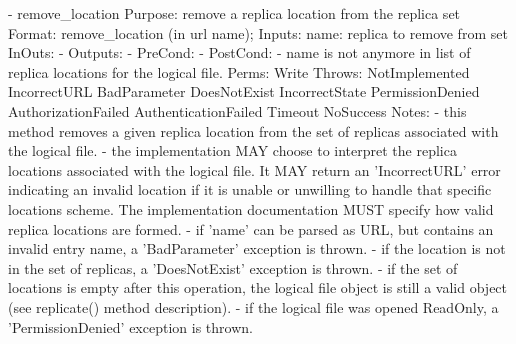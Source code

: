 \begin{myspec}
 
    - remove_location
      Purpose:  remove a replica location from the replica set
      Format:   remove_location  (in  url       name);
      Inputs:   name:             replica to remove from set
      InOuts:   -
      Outputs:  -
      PreCond:  -
      PostCond: - name is not anymore in list of replica 
                  locations for the logical file.
      Perms:    Write
      Throws:   NotImplemented
                IncorrectURL
                BadParameter
                DoesNotExist
                IncorrectState
                PermissionDenied
                AuthorizationFailed
                AuthenticationFailed
                Timeout
                NoSuccess
      Notes:    - this method removes a given replica location 
                  from the set of replicas associated with the 
                  logical file.
                - the implementation MAY choose to interpret the
                  replica locations associated with the logical 
                  file.  It MAY return an 'IncorrectURL' error 
                  indicating an invalid location if it is unable 
                  or unwilling to handle that specific locations
                  scheme.  The implementation documentation MUST 
                  specify how valid replica locations are formed.
                - if 'name' can be parsed as URL, but contains 
                  an invalid entry name, a 'BadParameter'
                  exception is thrown.
                - if the location is not in the set of
                  replicas, a 'DoesNotExist' exception is 
                  thrown.
                - if the set of locations is empty after this
                  operation, the logical file object is still 
                  a valid object (see replicate() method
                  description).
                - if the logical file was opened ReadOnly, a
                  'PermissionDenied' exception is thrown.
 

\end{myspec}
